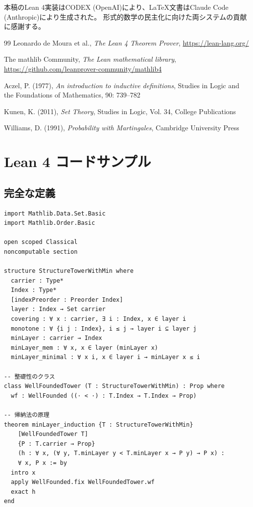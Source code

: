 \documentclass[a4paper,12pt]{ltjsarticle}
\begin{document}
本稿のLean 4実装はCODEX (OpenAI)により、\LaTeX 文書はClaude Code (Anthropic)により生成された。
形式的数学の民主化に向けた両システムの貢献に感謝する。

\begin{thebibliography}{99}
Leonardo de Moura et al., \textit{The Lean 4 Theorem Prover},
\url{https://lean-lang.org/}

The mathlib Community, \textit{The Lean mathematical library},
\url{https://github.com/leanprover-community/mathlib4}

Aczel, P. (1977), \textit{An introduction to inductive definitions},
Studies in Logic and the Foundations of Mathematics, 90: 739–782

Kunen, K. (2011), \textit{Set Theory}, Studies in Logic, Vol. 34,
College Publications

Williams, D. (1991), \textit{Probability with Martingales},
Cambridge University Press
\end{thebibliography}

\appendix

\section{Lean 4 コードサンプル}

\subsection{完全な定義}

\begin{lstlisting}[style=leanstyle]
import Mathlib.Data.Set.Basic
import Mathlib.Order.Basic

open scoped Classical
noncomputable section

structure StructureTowerWithMin where
  carrier : Type*
  Index : Type*
  [indexPreorder : Preorder Index]
  layer : Index → Set carrier
  covering : ∀ x : carrier, ∃ i : Index, x ∈ layer i
  monotone : ∀ {i j : Index}, i ≤ j → layer i ⊆ layer j
  minLayer : carrier → Index
  minLayer_mem : ∀ x, x ∈ layer (minLayer x)
  minLayer_minimal : ∀ x i, x ∈ layer i → minLayer x ≤ i

-- 整礎性のクラス
class WellFoundedTower (T : StructureTowerWithMin) : Prop where
  wf : WellFounded ((· < ·) : T.Index → T.Index → Prop)

-- 帰納法の原理
theorem minLayer_induction {T : StructureTowerWithMin}
    [WellFoundedTower T]
    {P : T.carrier → Prop}
    (h : ∀ x, (∀ y, T.minLayer y < T.minLayer x → P y) → P x) :
    ∀ x, P x := by
  intro x
  apply WellFounded.fix WellFoundedTower.wf
  exact h
end
\end{lstlisting}
\end{document}
